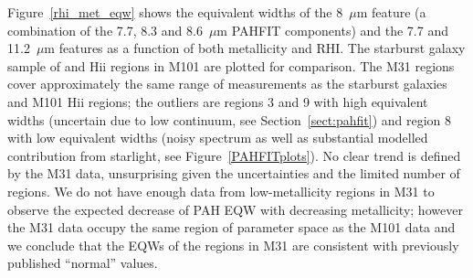 Figure~\ref{rhi_met_eqw} shows the equivalent widths of the  8~$\mu$m feature 
(a combination of the 7.7, 8.3 and 8.6~$\mu$m PAHFIT components) and the 
 7.7 and 11.2~$\mu$m features as a function of both metallicity and RHI. The starburst galaxy sample of \citet{Engelbracht_2008} 
and  H{\sc ii} regions in M101 \citep{Gordon:2008lr} are plotted for comparison.
The M31 regions cover approximately the same range of measurements as the starburst galaxies and M101 H{\sc ii} regions;
the outliers are regions 3 and 9 with high equivalent widths (uncertain due to low continuum, see Section~\ref{sect:pahfit}) and
region 8 with low equivalent widths (noisy spectrum as well as substantial modelled contribution from starlight, see Figure~\ref{PAHFITplots}).
No clear trend is defined by the M31 data, unsurprising given the uncertainties and the limited
number  of regions.
We do not have enough data from low-metallicity regions in M31 to observe the expected decrease of PAH EQW with decreasing 
metallicity; however the M31 data occupy the same region of parameter space as the M101 data
and we conclude that the EQWs of the regions in M31 are consistent with previously published ``normal'' values.




